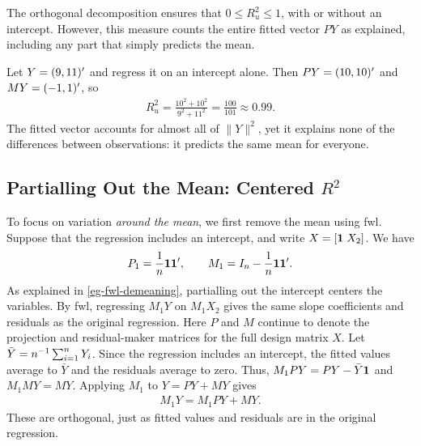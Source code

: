 \documentclass[a4paper,12pt]{article}
\begin{document}
\begin{remark}
	The orthogonal decomposition ensures that $0\le R_u^2\le1$, with or without an intercept.
	However, this measure counts the entire fitted vector $PY$ as explained,
	including any part that simply predicts the mean.
\end{remark}

\begin{example}\label{eg-r-squared-mean}
	Let $Y=(9,11)^{\prime}$ and regress it on an intercept alone.
	Then $PY=(10,10)^{\prime}$ and $MY=(-1,1)^{\prime}$, so
	\begin{align}
		R_u^2=\frac{10^2+10^2}{9^2+11^2}=\frac{100}{101}\approx0.99.
	\end{align}
	The fitted vector accounts for almost all of $\|Y\|^2$,
	yet it explains none of the differences between observations: it predicts the same mean for everyone.
\end{example}

\subsection{Partialling Out the Mean: Centered \texorpdfstring{$R^2$}{R-squared}}

To focus on variation \emph{around the mean}, we first remove the mean using \gls{fwl}.
Suppose that the regression includes an intercept, and write $X=[\mathbf{1}\;X_2]$.
We have
\begin{align}
	P_1=\frac1n\mathbf{1}\mathbf{1}^{\prime},
	\qquad M_1=I_n-\frac1n\mathbf{1}\mathbf{1}^{\prime}.
\end{align}
As explained in \autoref{eg-fwl-demeaning},
partialling out the intercept centers the variables.
By \gls{fwl}, regressing $M_1 Y$ on $M_1 X_2$ gives the same slope coefficients and residuals as the original regression.
Here $P$ and $M$ continue to denote the projection and residual-maker matrices for the full design matrix $X$.
Let $\bar Y=n^{-1}\sum_{i=1}^nY_i$.
Since the regression includes an intercept, the fitted values average to $\bar Y$ and the residuals average to zero.
Thus, $M_1PY=PY-\bar Y\mathbf{1}$ and $M_1MY=MY$.
Applying $M_1$ to $Y=PY+MY$ gives
\begin{align}
	M_1Y=M_1PY+MY.
\end{align}
These are orthogonal, just as fitted values and residuals are in the original regression.
\end{document}
